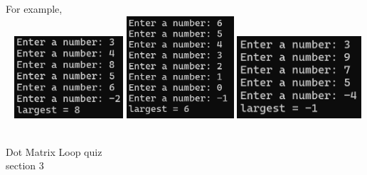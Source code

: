 \documentclass{article}
\begin{document}
\begin{enumerate}
		For example, \\ \ \hfill
		\includegraphics[height = 1.2in]{./imgs/largestEven1.PNG} \hfill  
		\includegraphics[height = 1.5in]{./imgs/largestEven2.PNG} \hfill  
		\includegraphics[height = 1.2in]{./imgs/largestEven3.PNG} \hfill \


\end{enumerate}
\pagebreak
Dot Matrix \hfill Loop quiz\\
section 3\\
\end{document}

